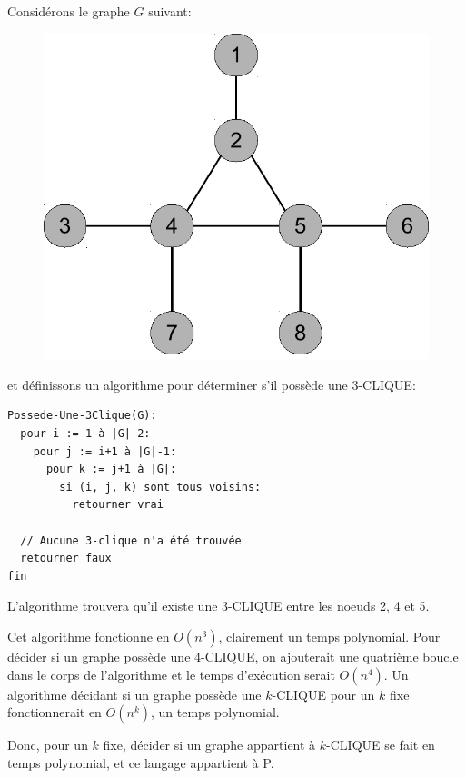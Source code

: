\documentclass[10pt]{article}
\begin{document}
Considérons le graphe $G$ suivant:

\begin{figure}[h]
  \centering
  \includegraphics[scale=0.4]{graphe3}
\end{figure}

et définissons un algorithme pour déterminer s'il possède une
3-CLIQUE:

\begin{verbatim}
Possede-Une-3Clique(G):
  pour i := 1 à |G|-2:
    pour j := i+1 à |G|-1:
      pour k := j+1 à |G|:
        si (i, j, k) sont tous voisins:
          retourner vrai

  // Aucune 3-clique n'a été trouvée
  retourner faux
fin
\end{verbatim}

L'algorithme trouvera qu'il existe une 3-CLIQUE entre les noeuds 2, 4
et 5.

Cet algorithme fonctionne en $O(n^3)$, clairement un temps polynomial.
Pour décider si un graphe possède une 4-CLIQUE, on ajouterait une
quatrième boucle dans le corps de l'algorithme et le temps d'exécution
serait $O(n^4)$.  Un algorithme décidant si un graphe possède une
$k$-CLIQUE pour un $k$ fixe fonctionnerait en $O(n^k)$, un temps
polynomial.

Donc, pour un $k$ fixe, décider si un graphe appartient à $k$-CLIQUE
se fait en temps polynomial, et ce langage appartient à P.
\end{document}
